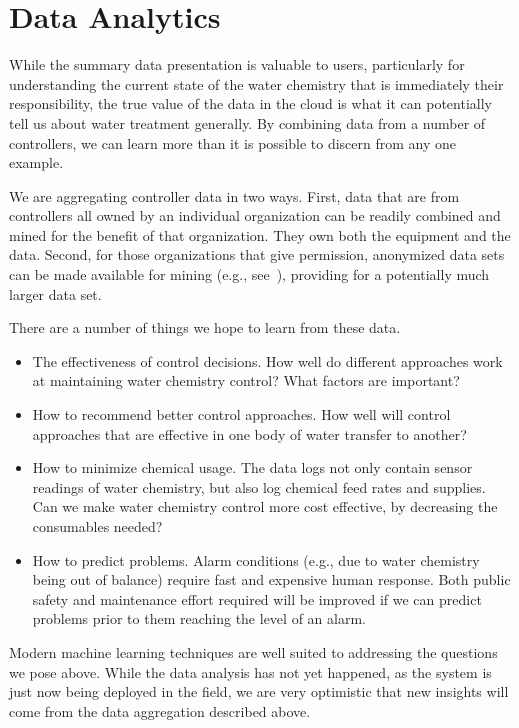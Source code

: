 \section{Data Analytics}
\label{sec:analytics}

While the summary data presentation is valuable to users, particularly for
understanding the current state of the water chemistry that is immediately
their responsibility, the true value of the data in the cloud is what it
can potentially tell us about water treatment generally.
By combining data from a number of controllers, we can learn more than
it is possible to discern from any one example.

We are aggregating controller data in two ways.  First, data that are
from controllers all owned by an individual organization can be readily
combined and mined for the benefit of that organization.  They own
both the equipment and the data. Second, for those organizations that
give permission, anonymized data sets can be made available for mining
(e.g., see~\cite{horey2007,zhong2009k}), providing for a potentially
much larger data set.

There are a number of things we hope to learn from these data.
\begin{itemize}
\item The effectiveness of control decisions.  How well do different
approaches work at maintaining water chemistry control?  What factors
are important?
\item How to recommend better control approaches.  How well will control
approaches that are effective in one body of water transfer to another?
\item How to minimize chemical usage.  The data logs not only contain
sensor readings of water chemistry, but also log chemical feed rates
and supplies.  Can we make water chemistry control more cost effective,
by decreasing the consumables needed?
\item How to predict problems. Alarm conditions (e.g., due to water
chemistry being out of balance) require fast and expensive human response.
Both public safety and maintenance effort required will be improved
if we can predict problems prior to them reaching the level of an alarm.
\end{itemize}

Modern machine learning techniques are well suited to addressing the
questions we pose above.
While the data analysis has not yet happened, as the system is just
now being deployed in the field, we are very optimistic that new insights
will come from the data aggregation described above.
